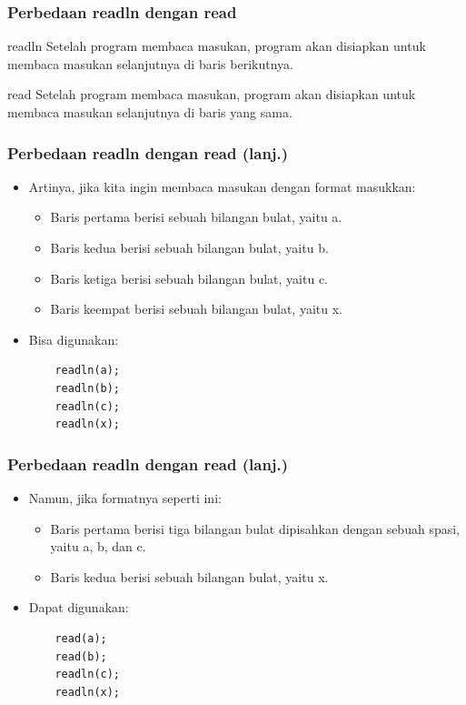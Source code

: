 \documentclass{beamer}
\begin{document}
\begin{frame}[fragile]
\frametitle{Perbedaan readln dengan read}
\begin{block}{readln}
    Setelah program membaca masukan, program akan disiapkan untuk membaca masukan selanjutnya di \alert{baris berikutnya}.
\end{block}
\begin{block}{read}
    Setelah program membaca masukan, program akan disiapkan untuk membaca masukan selanjutnya di \alert{baris yang sama}.
\end{block}
\end{frame}

\begin{frame}[fragile]
\frametitle{Perbedaan readln dengan read (lanj.)}
\begin{itemize}
    \item Artinya, jika kita ingin membaca masukan dengan format masukkan:
    \begin{itemize}
        \item Baris pertama berisi sebuah bilangan bulat, yaitu a.
        \item Baris kedua berisi sebuah bilangan bulat, yaitu b.
        \item Baris ketiga berisi sebuah bilangan bulat, yaitu c.
        \item Baris keempat berisi sebuah bilangan bulat, yaitu x.
    \end{itemize}

    \item Bisa digunakan:
    \begin{lstlisting}
    readln(a);
    readln(b);
    readln(c);
    readln(x);
    \end{lstlisting}
\end{itemize}
\end{frame}

\begin{frame}[fragile]
\frametitle{Perbedaan readln dengan read (lanj.)}
\begin{itemize}
    \item Namun, jika formatnya seperti ini:
    \begin{itemize}
        \item Baris pertama berisi tiga bilangan bulat dipisahkan dengan sebuah spasi, yaitu a, b, dan c.
        \item Baris kedua berisi sebuah bilangan bulat, yaitu x.
    \end{itemize}
    \item Dapat digunakan:
    \begin{lstlisting}
    read(a);
    read(b);
    readln(c);
    readln(x);
    \end{lstlisting}
\end{itemize}
\end{frame}
\end{document}
